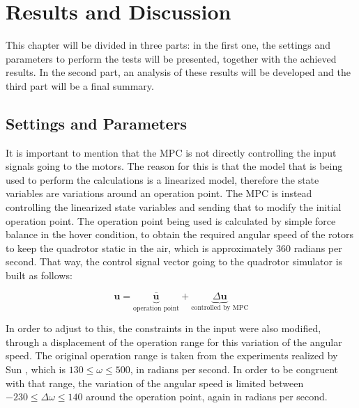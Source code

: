 \chapter{Results and Discussion}
\label{chap:Results_and_Discussion}

This chapter will be divided in three parts: in the first one, the settings and parameters to perform the tests will be presented, together with the achieved results. In the second part, an analysis of these results will be developed and the third part will be a final summary.

\section{Settings and Parameters}

It is important to mention that the MPC is not directly controlling the input signals going to the motors. The reason for this is that the model that is being used to perform the calculations is a linearized model, therefore the state variables are variations around an operation point. The MPC is instead controlling the linearized state variables and sending that to modify the initial operation point. The operation point being used is calculated by simple force balance in the hover condition, to obtain the required angular speed of the rotors to keep the quadrotor static in the air, which is approximately $360$ radians per second. That way, the control signal vector going to the quadrotor simulator is built as follows:

\begin{equation*}
\mathbf{u} = \underbrace{\mathbf{\bar{u}}}_\textrm{operation point} + \underbrace{\Delta \mathbf{u}}_\textrm{controlled by MPC}
\end{equation*}

In order to adjust to this, the constraints in the input were also modified, through a displacement of the operation range for this variation of the angular speed. The original operation range is taken from the experiments realized by Sun \cite{ref:YueSun2012}, which is $130 \leq \omega \leq 500$, in radians per second. In order to be congruent with that range, the variation of the angular speed is limited between $-230 \leq \Delta \omega \leq 140$ around the operation point, again in radians per second.\\ 

